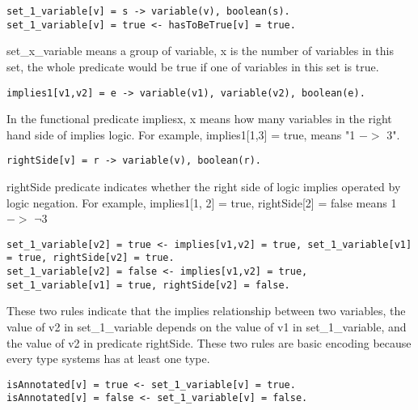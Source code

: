 \documentclass[11pt]{article}
\begin{document}
\begin{lstlisting}
set_1_variable[v] = s -> variable(v), boolean(s).
set_1_variable[v] = true <- hasToBeTrue[v] = true.
\end{lstlisting}
set\_x\_variable means a group of variable, x is the number of variables in this set, the whole predicate would be true if one of variables in this set is true.

\begin{lstlisting}
implies1[v1,v2] = e -> variable(v1), variable(v2), boolean(e).
\end{lstlisting}
In the functional predicate impliesx, x means how many variables in the right hand side of implies logic. For example, implies1[1,3] = true, means "1 $->$ 3".

\begin{lstlisting}
rightSide[v] = r -> variable(v), boolean(r).
\end{lstlisting}
rightSide predicate indicates whether the right side of logic implies operated by logic negation. For example, implies1[1, 2] = true, rightSide[2] = false means 1 $->$ $\neg$3

\begin{lstlisting}
set_1_variable[v2] = true <- implies[v1,v2] = true, set_1_variable[v1] = true, rightSide[v2] = true.
set_1_variable[v2] = false <- implies[v1,v2] = true, set_1_variable[v1] = true, rightSide[v2] = false.
\end{lstlisting}
These two rules indicate that the implies relationship between two variables, the value of v2 in set\_1\_variable depends on the value of v1 in set\_1\_variable, and the value of v2 in predicate rightSide. These two rules are basic encoding because every type systems has at least one type.
\begin{lstlisting}
isAnnotated[v] = true <- set_1_variable[v] = true.
isAnnotated[v] = false <- set_1_variable[v] = false.
\end{lstlisting}
 \par 
\end{document}
